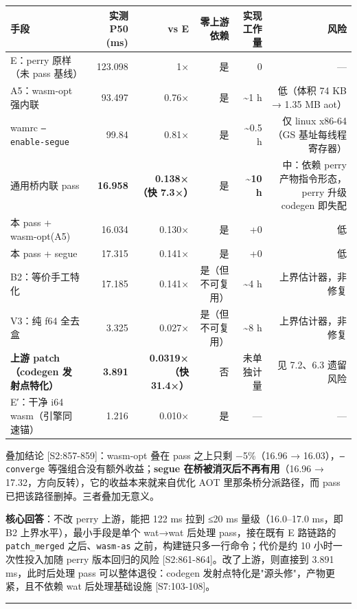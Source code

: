 \documentclass[11pt, a4paper]{article}
\begin{document}
\begin{center}\small\begin{tabular}{lrrrrr}
\toprule
手段 & 实测 P50 (ms) & vs E & 零上游依赖 & 实现工作量 & 风险 \\
\midrule
E：perry 原样（未 pass 基线） & 123.098 & 1× & 是 & 0 & — \\
A5：wasm-opt 强内联 & 93.497 & 0.76× & 是 & \textasciitilde{}1 h & 低（体积 74 KB → 1.35 MB aot） \\
wamrc \texttt{--enable-segue} & 99.84 & 0.81× & 是 & \textasciitilde{}0.5 h & 仅 linux x86-64（GS 基址每线程寄存器） \\
通用桥内联 pass & \textbf{16.958} & \textbf{0.138×（快 7.3×）} & 是 & \textbf{\textasciitilde{}10 h} & 中：依赖 perry 产物指令形态，perry 升级 codegen 即失配 \\
本 pass + wasm-opt(A5) & 16.034 & 0.130× & 是 & +0 & 低 \\
本 pass + segue & 17.315 & 0.141× & 是 & +0 & 低 \\
B2：等价手工特化 & 17.185 & 0.141× & 是（但不可复用） & \textasciitilde{}4 h & 上界估计器，非修复 \\
V3：纯 f64 全去盒 & 3.325 & 0.027× & 是（但不可复用） & \textasciitilde{}8 h & 上界估计器，非修复 \\
\textbf{上游 patch（codegen 发射点特化）} & \textbf{3.891} & \textbf{0.0319×（快 31.4×）} & 否 & 未单独计量 & 见 7.2、6.3 遗留风险 \\
E′：干净 i64 wasm（引擎同速锚） & 1.216 & 0.010× & 是 & — & — \\
\bottomrule
\end{tabular}\end{center}


叠加结论 [S2:857-859]：wasm-opt 叠在 pass 之上只剩 −5\%（16.96 → 16.03），\texttt{--converge} 等强组合没有额外收益；\textbf{segue 在桥被消灭后不再有用}（16.96 → 17.32，方向反转），它的收益本来就来自优化 AOT 里那条桥分派路径，而 pass 已把该路径删掉。三者叠加无意义。


\textbf{核心回答}：不改 perry 上游，能把 122 ms 拉到 ≤20 ms 量级（16.0–17.0 ms，即 B2 上界水平），最小手段是单个 wat→wat 后处理 pass，接在既有 E 路链路的 \texttt{patch\_merged} 之后、\texttt{wasm-as} 之前，构建链只多一行命令；代价是约 10 小时一次性投入加随 perry 版本回归的风险 [S2:861-864]。改了上游，则直接到 3.891 ms，此时后处理 pass 可以整体退役：codegen 发射点特化是"源头修"，产物更紧，且不依赖 wat 后处理基础设施 [S7:103-108]。


\bigskip\hrule\bigskip
\end{document}
